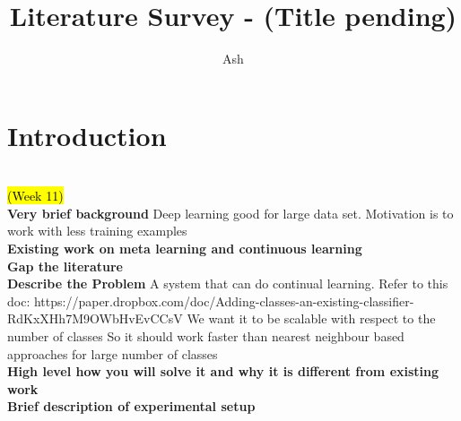 \documentclass{report}
\title{Literature Survey - (Title pending)}
\author{Ash}
\newcommand{\TODO}[1]{\sethlcolor{pink}\hl{\\(#1)\\}}
\begin{document}
	
	\maketitle
	\thispagestyle{empty}
	\newpage
	\thispagestyle{empty}
	\tableofcontents
	\newpage
	\thispagestyle{empty}
	\listoffigures
	\newpage
	
	\chapter{Introduction}
	\TODO{Week 11}
	\textbf{Very brief background}
	Deep learning good for large data set.
	Motivation is to work with less training examples \\
	\textbf{Existing work on meta learning and continuous learning} \\
	\textbf{Gap the literature} \\
	\textbf{Describe the Problem}
	A system that can do continual learning. Refer to this doc:
	https://paper.dropbox.com/doc/Adding-classes-an-existing-classifier-RdKxXHh7M9OWbHvEvCCsV
	We want it to be scalable with respect to the number of classes
	So it should work faster than nearest neighbour based approaches for large number of classes \\
	\textbf{High level how you will solve it and why it is different from existing work} \\
	\textbf{Brief description of experimental setup} \\
	
	
\end{document}
